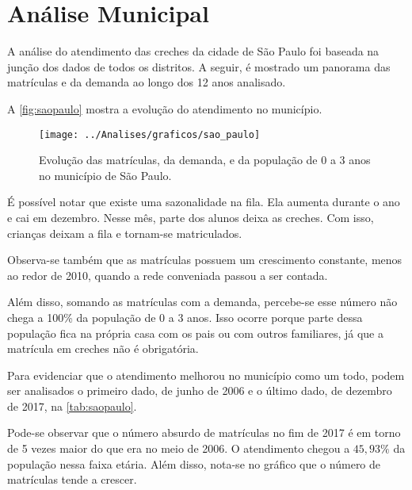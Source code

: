 \documentclass[12pt, a4]{book}
\begin{document}
	
\chapter{Análise Municipal}

A análise do atendimento das creches da cidade de São Paulo foi baseada na junção dos dados de todos os distritos. A seguir, é mostrado um panorama das matrículas e da demanda ao longo dos 12 anos analisado.

A \autoref{fig:saopaulo} mostra a evolução do atendimento no município.

\begin{figure}[H]
	\centering
	\texttt{[image: ../Analises/graficos/sao\_paulo]}
	\caption{Evolução das matrículas, da demanda, e da população de 0 a 3 anos no município de São Paulo.}
	\label{fig:saopaulo}
\end{figure}

É possível notar que existe uma sazonalidade na fila. Ela aumenta durante o ano e cai em dezembro. Nesse mês, parte dos alunos deixa as creches. Com isso, crianças deixam a fila e tornam-se matriculados.

Observa-se também que as matrículas possuem um crescimento constante, menos ao redor de 2010, quando a rede conveniada passou a ser contada. 

Além disso, somando as matrículas com a demanda, percebe-se esse número não chega a 100\% da população de 0 a 3 anos. Isso ocorre porque parte dessa população fica na própria casa com os pais ou com outros familiares, já que a matrícula em creches não é obrigatória.

Para evidenciar que o atendimento melhorou no município como um todo, podem ser analisados o primeiro dado, de junho de 2006 e o último dado, de dezembro de 2017, na \autoref{tab:saopaulo}.

Pode-se observar que o número absurdo de matrículas no fim de 2017 é em torno de 5 vezes maior do que era no meio de 2006. O atendimento chegou a $ 45,93\% $ da população nessa faixa etária. Além disso, nota-se no gráfico que o número de matrículas tende a crescer.
\end{document}
